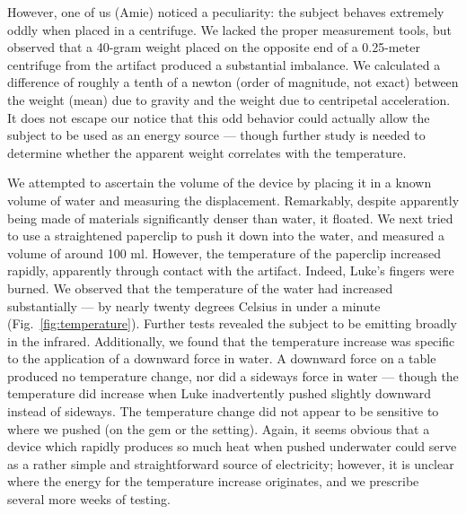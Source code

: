 \documentclass[10pt]{article}
\begin{document}
However, one of us (Amie) noticed a peculiarity: the subject behaves extremely oddly when placed in a centrifuge.
We lacked the proper measurement tools, but observed that a 40-gram weight placed on the opposite end of a 0.25-meter centrifuge from the artifact produced a substantial imbalance.
We calculated a difference of roughly a tenth of a newton (order of magnitude, not exact) between the weight (mean) due to gravity and the weight due to centripetal acceleration.
It does not escape our notice that this odd behavior could actually allow the subject to be used as an energy source --- though further study is needed to determine whether the apparent weight correlates with the temperature.

We attempted to ascertain the volume of the device by placing it in a known volume of water and measuring the displacement.
Remarkably, despite apparently being made of materials significantly denser than water, it floated.
We next tried to use a straightened paperclip to push it down into the water, and measured a volume of around 100 ml.
However, the temperature of the paperclip increased rapidly, apparently through contact with the artifact. 
Indeed, Luke's fingers were burned.
We observed that the temperature of the water had increased substantially --- by nearly twenty degrees Celsius in under a minute (Fig.~\ref{fig:temperature}).
Further tests revealed the subject to be emitting broadly in the infrared.
Additionally, we found that the temperature increase was specific to the application of a downward force in water.
A downward force on a table produced no temperature change, nor did a sideways force in water --- though the temperature did increase when Luke inadvertently pushed slightly downward instead of sideways.
The temperature change did not appear to be sensitive to where we pushed (on the gem or the setting).
Again, it seems obvious that a device which rapidly produces so much heat when pushed underwater could serve as a rather simple and straightforward source of electricity; however, it is unclear where the energy for the temperature increase originates, and we prescribe several more weeks of testing.
\end{document}
